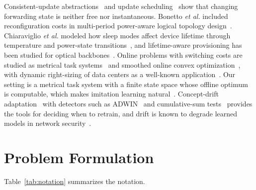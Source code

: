 \documentclass[preprint,12pt]{elsarticle}
\begin{document}
Consistent-update abstractions~\cite{reitblatt2012abstractions} and update scheduling~\cite{jin2014dionysus} show that changing forwarding state is neither free nor instantaneous. Bonetto \emph{et al.} included reconfiguration costs in multi-period power-aware logical topology design~\cite{bonetto2013multiperiod}. Chiaraviglio \emph{et al.} modeled how sleep modes affect device lifetime through temperature and power-state transitions~\cite{chiaraviglio2015lifetime,chiaraviglio2014impact}, and lifetime-aware provisioning has been studied for optical backbones~\cite{wiatr2016lifetime}. Online problems with switching costs are studied as metrical task systems~\cite{borodin1992mts} and smoothed online convex optimization~\cite{chen2018obd}, with dynamic right-sizing of data centers as a well-known application~\cite{lin2013rightsizing}. Our setting is a metrical task system with a finite state space whose offline optimum is computable, which makes imitation learning natural~\cite{ross2011dagger}. Concept-drift adaptation~\cite{gama2014drift,lu2019drift} with detectors such as ADWIN~\cite{bifet2007adwin} and cumulative-sum tests~\cite{page1954cusum} provides the tools for deciding when to retrain, and drift is known to degrade learned models in network security~\cite{andresini2021insomnia}.

\section{Problem Formulation}\label{sec:problem}

Table~\ref{tab:notation} summarizes the notation.
\end{document}
